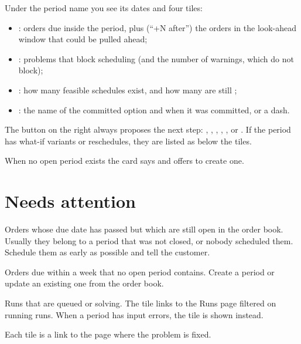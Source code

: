 Under the period name you see its dates and four tiles:

\begin{itemize}
  \item {}: orders due inside the period, plus (``+N after'') the orders in the look-ahead
        window that could be pulled ahead;
  \item {}: problems that block scheduling (and the number of warnings, which do not block);
  \item {}: how many feasible schedules exist, and how many are still ;
  \item {}: the name of the committed option and when it was committed, or a dash.
\end{itemize}

The button on the right always proposes the next step: , ,
, , ,  or
. If the period has what-if variants or reschedules, they are listed as  below the tiles.

When no open period exists the card says  and offers to create one.

\section{Needs attention}

\begin{description}[style=nextline, leftmargin=1.2em, font=\bfseries\color{brand}]
  \item[Overdue open orders] Orders whose due date has passed but which are still open in the order book.
        Usually they belong to a period that was not closed, or nobody scheduled them. Schedule them as
        early as possible and tell the customer.
  \item[Orders due $\leq$ 7 days, no period] Orders due within a week that no open period contains. Create a
        period or update an existing one from the order book.
  \item[Solver at work] Runs that are queued or solving. The tile links to the Runs page filtered on running
        runs. When a period has input errors, the tile  is shown instead.
\end{description}

Each tile is a link to the page where the problem is fixed.

